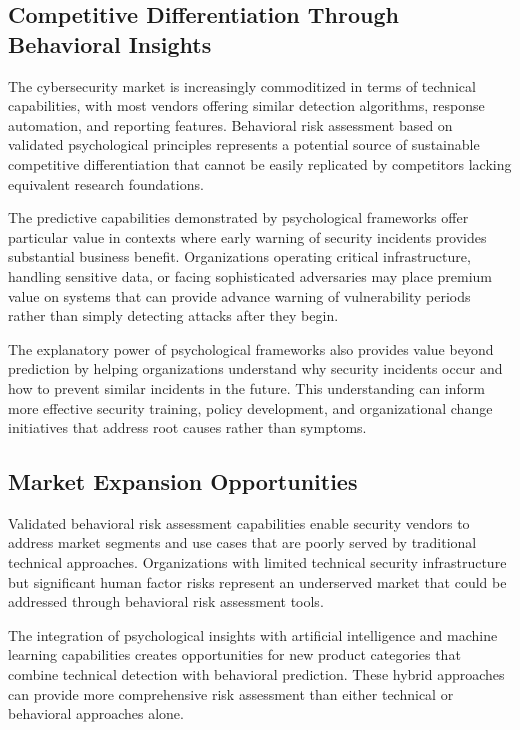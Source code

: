 \documentclass[10pt,twocolumn]{IEEEtran}
\begin{document}
\subsection{Competitive Differentiation Through Behavioral Insights}

The cybersecurity market is increasingly commoditized in terms of technical capabilities, with most vendors offering similar detection algorithms, response automation, and reporting features. Behavioral risk assessment based on validated psychological principles represents a potential source of sustainable competitive differentiation that cannot be easily replicated by competitors lacking equivalent research foundations.

The predictive capabilities demonstrated by psychological frameworks offer particular value in contexts where early warning of security incidents provides substantial business benefit. Organizations operating critical infrastructure, handling sensitive data, or facing sophisticated adversaries may place premium value on systems that can provide advance warning of vulnerability periods rather than simply detecting attacks after they begin.

The explanatory power of psychological frameworks also provides value beyond prediction by helping organizations understand why security incidents occur and how to prevent similar incidents in the future. This understanding can inform more effective security training, policy development, and organizational change initiatives that address root causes rather than symptoms.

\subsection{Market Expansion Opportunities}

Validated behavioral risk assessment capabilities enable security vendors to address market segments and use cases that are poorly served by traditional technical approaches. Organizations with limited technical security infrastructure but significant human factor risks represent an underserved market that could be addressed through behavioral risk assessment tools.

The integration of psychological insights with artificial intelligence and machine learning capabilities creates opportunities for new product categories that combine technical detection with behavioral prediction. These hybrid approaches can provide more comprehensive risk assessment than either technical or behavioral approaches alone.
\end{document}
